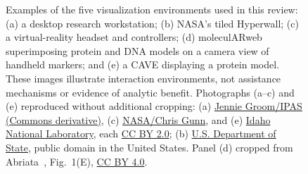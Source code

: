 \begin{figure}[t]
\caption{Examples of the five visualization environments used in this review: (a) a desktop research workstation; (b) NASA's tiled Hyperwall; (c) a virtual-reality headset and controllers; (d) moleculARweb superimposing protein and DNA models on a camera view of handheld markers; and (e) a CAVE displaying a protein model. These images illustrate interaction environments, not assistance mechanisms or evidence of analytic benefit. Photographs (a--c) and (e) reproduced without additional cropping: (a) \href{https://commons.wikimedia.org/wiki/File:Scientist_working_with_personal_computer,_2013_(Dell_Precision_T3500_Workstation).jpeg}{Jennie Groom/IPAS (Commons derivative)}, (c) \href{https://commons.wikimedia.org/wiki/File:Exploring_the_Universe_in_Virtual_Reality.jpg}{NASA/Chris Gunn}, and (e) \href{https://commons.wikimedia.org/wiki/File:Cave_automatic_virtual_environment.jpg}{Idaho National Laboratory}, each \href{https://creativecommons.org/licenses/by/2.0/}{CC BY 2.0}; (b) \href{https://commons.wikimedia.org/wiki/File:NASA's_Hyperwall_Shows_the_Sea_Surface_Temperature_(10946045463).jpg}{U.S. Department of State}, public domain in the United States. Panel (d) cropped from Abriata~\cite{Abriata2025MolecularWebUniverse}, Fig.~1(E), \href{https://creativecommons.org/licenses/by/4.0/}{CC BY 4.0}.}
\label{fig:modality-environments}
\end{figure}
